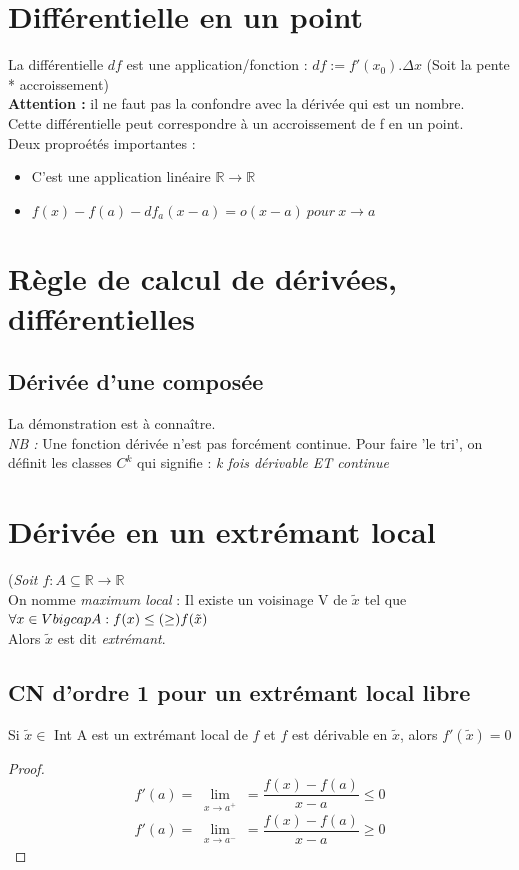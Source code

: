 \documentclass[11pt, a4paper, openany]{book}
\begin{document}
\section{Différentielle en un point}
La différentielle $df$ est une application/fonction : $df := f'(x_{0}).\Delta x$ (Soit la pente * accroissement)\\
\textbf{Attention :} il ne faut pas la confondre avec la dérivée qui est un nombre.\\
Cette différentielle peut correspondre à un accroissement de f en un point. \\
Deux proproétés importantes :
\begin{itemize}
	\item C'est une application linéaire $\mathbb{R} \rightarrow \mathbb{R}$
	\item $f(x) - f(a) - df_{a}(x-a) = o(x-a)\ pour\ x \rightarrow a$
\end{itemize}

\section{Règle de calcul de dérivées, différentielles}
\subsection{Dérivée d'une composée}
La démonstration est à connaître.\\
\textit{NB : } Une fonction dérivée n'est pas forcément continue. Pour faire 'le tri', on définit les classes $C^{k}$ qui signifie : \textit{k fois dérivable ET continue}

\section{Dérivée en un extrémant local}
(\textit{Soit $ f : A \subseteq \mathbb{R} \rightarrow \mathbb{R}$}\\
On nomme \textit{maximum local} : Il existe un voisinage V de $\tilde{x}$ tel que $\forall x \in V \\bigcap A : f(x) \leq (\geq) f(\tilde{x})$\\
Alors $\tilde{x}$ est dit \textit{extrémant}.

\subsection{CN d'ordre 1 pour un extrémant local libre}
Si $\tilde{x} \in$ Int A est un extrémant local de $f$ et $f$ est dérivable en $\tilde{x}$, alors $f'(\tilde{x}) = 0$\\
\begin{proof}
	$$f'(a) = \lim\limits_{\substack{x \to a^{+}}} = \frac{f(x) - f(a)}{x-a} \leq 0$$
	$$f'(a) = \lim\limits_{\substack{x \to a^{-}}} = \frac{f(x) - f(a)}{x-a} \geq 0$$
\end{proof}
\end{document}
